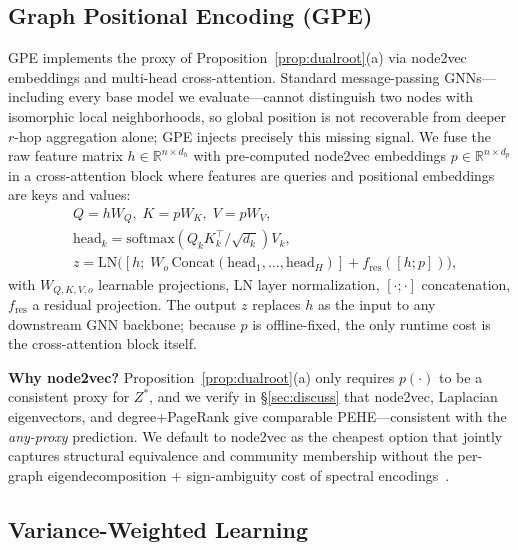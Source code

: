 \documentclass[sigconf,anonymous,review]{acmart}
\begin{document}
\subsection{Graph Positional Encoding (GPE)}\label{sec:gpe}

GPE implements the proxy of Proposition~\ref{prop:dualroot}(a) via node2vec~\cite{grover2016node2vec} embeddings and multi-head cross-attention. Standard message-passing GNNs---including every base model we evaluate---cannot distinguish two nodes with isomorphic local neighborhoods, so global position is not recoverable from deeper $r$-hop aggregation alone; GPE injects precisely this missing signal. We fuse the raw feature matrix $h \in \mathbb{R}^{n \times d_h}$ with pre-computed node2vec embeddings $p \in \mathbb{R}^{n \times d_p}$ in a cross-attention block where features are queries and positional embeddings are keys and values:
\begin{align}
    &Q = hW_Q,\; K = pW_K,\; V = pW_V, \label{eq:qkv} \\
    &\mathrm{head}_k = \mathrm{softmax}\!\left(Q_k K_k^\top / \sqrt{d_k}\right) V_k, \label{eq:head} \\
    &z = \mathrm{LN}\!\bigl([h;\; W_o\,\mathrm{Concat}(\mathrm{head}_1,\ldots,\mathrm{head}_H)] + f_{\mathrm{res}}([h;p])\bigr), \label{eq:fuse}
\end{align}
with $W_{Q,K,V,o}$ learnable projections, LN layer normalization, $[\cdot;\cdot]$ concatenation, $f_{\mathrm{res}}$ a residual projection. The output $z$ replaces $h$ as the input to any downstream GNN backbone; because $p$ is offline-fixed, the only runtime cost is the cross-attention block itself.

\textbf{Why node2vec?} Proposition~\ref{prop:dualroot}(a) only requires $p(\cdot)$ to be a consistent proxy for $Z^*$, and we verify in §\ref{sec:discuss} that node2vec, Laplacian eigenvectors, and degree+PageRank give comparable PEHE---consistent with the \emph{any-proxy} prediction. We default to node2vec as the cheapest option that jointly captures structural equivalence and community membership without the per-graph eigendecomposition + sign-ambiguity cost of spectral encodings~\cite{lim2023signnet}.

\subsection{Variance-Weighted Learning}\label{sec:var}
\end{document}
